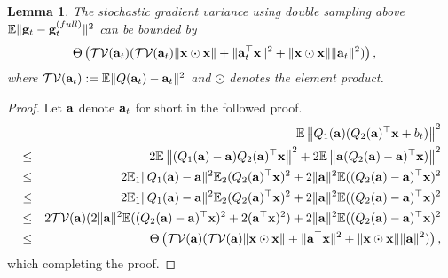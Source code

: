 \documentclass{article}
\def\a{{\bf a}}
\def\g{{\bf g}}
\def\x{{\bf x}}
\def\E{\mathbb{E}}
\newtheorem{lemma}{Lemma}
\begin{document}
\begin{lemma} 
The stochastic gradient variance using double sampling above $\E\|\g_t - \g_t^{(full)}\|^2$ can be bounded by
\begin{align*}
&\Theta\left(\mathcal{TV}(\a_t) (\mathcal{TV}(\a_t)\|\x\odot \x\| + \|\a_t^\top \x\|^2 + \|\x\odot \x\|\|\a_t\|^2)\right),
\end{align*}
where $\mathcal{TV}(\a_t) := \E\|Q(\a_t) - \a_t\|^2$ and $\odot$ denotes the element product.
\end{lemma}
\begin{proof}
Let $\a$ denote $\a_t$ for short in the followed proof.
\begin{eqnarray*}
& & \E\left\|Q_1(\a)(Q_2(\a)^\top \x + b_t)\right\|^2
\\
& \leq & 
2\E\left\| (Q_1(\a)- \a) Q_2(\a)^\top \x \right\|^2 + 2\E\left\| \a(Q_2(\a) - \a)^\top \x) \right\|^2
\\
& \leq &
2 \E_1 \|Q_1(\a)-\a\|^2\E_2(Q_2(\a)^\top \x)^2 + 2 \|\a\|^2 \E((Q_2(\a)-\a)^\top\x)^2
\\
& \leq &
2 \E_1 \|Q_1(\a)-\a\|^2\E_2(Q_2(\a)^\top \x)^2 + 2 \|\a\|^2 \E((Q_2(\a)-\a)^\top\x)^2
\\
& \leq &
2 \mathcal{TV}(\a)(2 \|\a\|^2 \E((Q_2(\a)-\a)^\top\x)^2 + 2(\a^\top \x)^2)+ 2 \|\a\|^2 \E((Q_2(\a)-\a)^\top\x)^2
\\
& \leq &
\Theta\left(\mathcal{TV}(\a) (\mathcal{TV}(\a)\|\x\odot \x\| + \|\a^\top \x\|^2 + \|\x\odot \x\|\|\a\|^2)\right),
\end{eqnarray*}
which completing the proof.
\end{proof}
\end{document}

